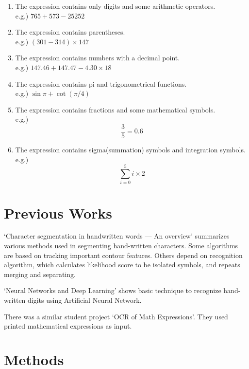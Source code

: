 \documentclass[10pt,twocolumn,letterpaper]{article}
\begin{document}
\begin{enumerate}
\item The expression contains only digits and some arithmetic operators. \\
e.g.) $765+573-25252$

\item The expression contains parentheses. \\
e.g.) $(301-314)\times 147$

\item The expression contains numbers with a decimal point. \\
e.g.) $147.46 + 147.47 - 4.30 \times 18$

\item The expression contains pi and trigonometrical functions. \\
e.g.) $\sin \pi + \cot (\pi / 4)$

\item The expression contains fractions and some mathematical symbols. \\
e.g.) $$ \frac{3}{5} = 0.6 $$

\item The expression contains sigma(summation) symbols and integration symbols. \\
e.g.) $$ \sum_{i=0}^{5} i \times 2 $$

\end{enumerate}

\section{Previous Works}
`Character segmentation in handwritten words — An overview'
\cite{Lu199677} summarizes various methods used in segmenting hand-written characters.
Some algorithms are based on tracking important contour features.
Others depend on recognition algorithm,
which calculates likelihood score to be isolated symbols,
and repeats merging and separating.

`Neural Networks and Deep Learning' \cite{MichaelNielsen} shows basic technique to recognize hand-written digits using Artificial Neural Network.

There was a similar student project `OCR of Math Expressions'\cite{OCRMATH}.
They used printed mathematical expressions as input.

\section{Methods}
\end{document}
